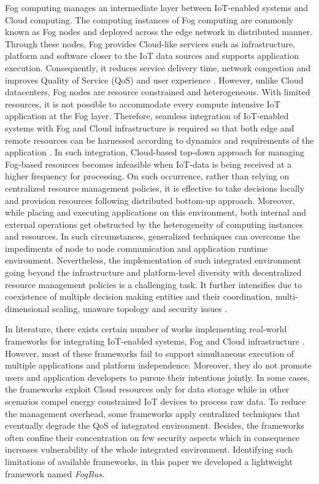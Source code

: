 \documentclass[final,5p,times,twocolumn]{elsarticle}
\begin{document}
\par Fog computing manages an intermediate layer between IoT-enabled systems and Cloud computing. The computing instances of Fog computing are commonly known as Fog nodes and deployed across the edge network in distributed manner. Through these nodes, Fog provides Cloud-like services such as infrastructure, platform and software closer to the IoT data sources and supports application execution. Consequently, it reduces service delivery time, network congestion and improves Quality of Service (QoS) and user experience \cite{QoE}. However, unlike Cloud datacenters, Fog nodes are resource constrained and heterogeneous. With limited resources, it is not possible to accommodate every compute intensive IoT application at the Fog layer. Therefore, seamless integration of IoT-enabled systems with Fog and Cloud infrastructure is required so that both edge and remote resources can be harnessed according to dynamics and requirements of the application \cite{interoperability}. In such integration, Cloud-based top-down approach for managing Fog-based resources becomes infeasible when IoT-data is being received at a higher frequency for processing. On such occurrence, rather than relying on centralized resource management policies, it is effective to take decisions locally and provision resources following distributed bottom-up approach. Moreover, while placing and executing applications on this environment, both internal and external operations get obstructed by the heterogeneity of computing instances and resources. In such circumstances, generalized techniques can overcome the impediments of node to node communication and application runtime environment. Nevertheless, the implementation of such integrated environment going beyond the infrastructure and platform-level diversity with decentralized resource management policies is a challenging task. It further intensifies due to coexistence of multiple decision making entities and their coordination, multi-dimensional scaling, unaware topology and security issues \cite{ifogsim-Gupta}.   
%
\par In literature, there exists certain number of works implementing real-world frameworks for integrating IoT-enabled systems, Fog and Cloud infrastructure \cite{amir} \cite{dubey} \cite{Yangui} \cite{Bruneo}. However, most of these frameworks fail to support simultaneous execution of multiple applications and platform independence. Moreover, they do not promote users and application developers to pursue their intentions jointly. In some cases, the frameworks exploit Cloud resources only for data storage while in other scenarios compel energy constrained IoT devices to process raw data. To reduce the management overhead, some frameworks apply centralized techniques that eventually degrade the QoS of integrated environment. Besides, the frameworks often confine their concentration on few security aspects which in consequence increases vulnerability of the whole integrated environment. Identifying such limitations of available frameworks, in this paper we developed a lightweight framework named \textit{FogBus}. 
\end{document}
